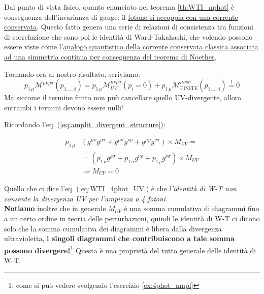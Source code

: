 \documentclass[../main.tex]{subfiles}
\begin{document}
\begin{enumerate}
                \begin{nota}
                    Dal punto di vista fisico, quanto enunciato nel teorema \ref{th:WTI_nphot} è conseguenza dell'invarianza di gauge: il \href{https://physics.stackexchange.com/questions/231092/general-principles-require-that-a-massless-vector-couple-to-a-conserved-current}{fotone si accoppia con una corrente conservata}. Questo fatto genera una serie di relazioni di consistenza tra funzioni di correlazione che sono poi le identità di Ward-Takahashi, che volendo possono essere viste come l'\href{https://en.wikipedia.org/wiki/Ward%E2%80%93Takahashi_identity}{analogo quantistico della corrente conservata classica associata ad una simmetria continua per conseguenza del teorema di Noether}.
                    \label{note:WT_Gaugeiv_conseq}
                \end{nota}
                
                Tornando ora al nostro risultato, scriviamo:
                \[
                p_{1\,\mu}\mathscr{M}^{\mu\nu\rho\sigma}(p_{1,..,4}) = p_{1\,\mu}\mathscr{M}^{\mu\nu\rho\sigma}_{UV}(p_i=0) + p_{1\,\mu}\mathscr{M}^{\mu\nu\rho\sigma}_\text{FINITE}(p_{1,..,4}) \overset{!}{=} 0
                \]
                Ma siccome il termine finito non può cancellare quello UV-divergente, allora entrambi i termini devono essere nulli!

                Ricordando l'eq. (\ref{eq:amplit_divergent_structure}):
                
                \begin{equation}
                \begin{split}  
                p_{1\,\mu}
                &(g^{\mu\nu}g^{\rho\sigma} + g^{\mu\sigma}g^{\nu\rho} + g^{\mu\rho}g^{\nu\sigma})\times M_{UV} =\\
                &= (p_{1\,\nu}g^{\rho\sigma} + p_{1\,\sigma}g^{\nu\rho} + p_{1\,\rho}g^{\nu\sigma})\times M_{UV} \\
                &\Rightarrow \boxed{M_{UV}=0}
                \end{split}
                \label{eq:WTI_4phot_UV}
                \end{equation}
                
                Quello che ci dice l'eq. (\ref{eq:WTI_4phot_UV}) è che \textit{l'identità di W-T non consente la divergenza UV per l'ampiezza a 4 fotoni}.\\

                \textbf{Notiamo} inoltre che in generale $M_{UV}$ è una somma cumulativa di diagrammi fino a un certo ordine in teoria delle perturbazioni, quindi le identità di W-T ci dicono solo che la somma cumulativa dei diagrammi è libera dalla divergenza ultravioletta, \textbf{i singoli diagrammi che contribuiscono a tale somma possono divergere!}\footnote{come si può vedere svolgendo l'esercizio \ref{ex:4phot_ampl}} Questa è una proprietà del tutto generale delle identità di W-T.
\end{enumerate}
\end{document}
